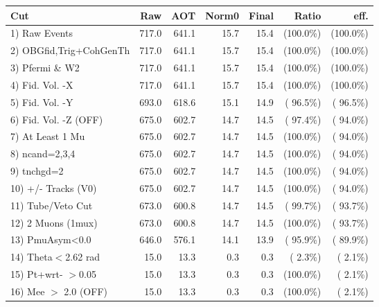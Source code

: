  \begin{table}[h!]\centering
 \begin{tabular}{||l||r|r|r|r|r|r||}
 \hline
 \hline
 Cut & Raw & AOT & Norm0 & Final & Ratio & eff.       \\
 \hline
  1) Raw Events           &        717.0 &        641.1 &         15.7 &         15.4 & (100.0\%) & (100.0\%) \\
  2) OBGfid,Trig+CohGenTh &        717.0 &        641.1 &         15.7 &         15.4 & (100.0\%) & (100.0\%) \\
  3) Pfermi \& W2         &        717.0 &        641.1 &         15.7 &         15.4 & (100.0\%) & (100.0\%) \\
  4) Fid. Vol. -X         &        717.0 &        641.1 &         15.7 &         15.4 & (100.0\%) & (100.0\%) \\
  5) Fid. Vol. -Y         &        693.0 &        618.6 &         15.1 &         14.9 & ( 96.5\%) & ( 96.5\%) \\
  6) Fid. Vol. -Z (OFF)   &        675.0 &        602.7 &         14.7 &         14.5 & ( 97.4\%) & ( 94.0\%) \\
  7) At Least 1 Mu        &        675.0 &        602.7 &         14.7 &         14.5 & (100.0\%) & ( 94.0\%) \\
  8) ncand=2,3,4          &        675.0 &        602.7 &         14.7 &         14.5 & (100.0\%) & ( 94.0\%) \\
  9) tnchgd=2             &        675.0 &        602.7 &         14.7 &         14.5 & (100.0\%) & ( 94.0\%) \\
 10) +/- Tracks (V0)      &        675.0 &        602.7 &         14.7 &         14.5 & (100.0\%) & ( 94.0\%) \\
 11) Tube/Veto Cut        &        673.0 &        600.8 &         14.7 &         14.5 & ( 99.7\%) & ( 93.7\%) \\
 12) 2 Muons (1mux)       &        673.0 &        600.8 &         14.7 &         14.5 & (100.0\%) & ( 93.7\%) \\
 13) PmuAsym<0.0          &        646.0 &        576.1 &         14.1 &         13.9 & ( 95.9\%) & ( 89.9\%) \\
 14) Theta$<$2.62 rad     &         15.0 &         13.3 &          0.3 &          0.3 & (  2.3\%) & (  2.1\%) \\
 15) Pt+wrt- $>$0.05      &         15.0 &         13.3 &          0.3 &          0.3 & (100.0\%) & (  2.1\%) \\
 16) Mee $>$ 2.0  (OFF)   &         15.0 &         13.3 &          0.3 &          0.3 & (100.0\%) & (  2.1\%) \\

\end{tabular}
\end{table}

